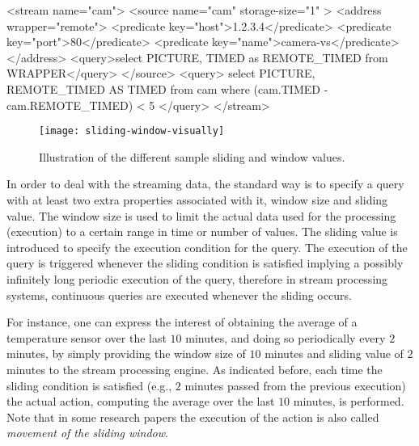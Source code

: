 \begin{xmlcode}[caption={A stream using both local and remote timestamps.}, label=vs:complex-time]
<stream name="cam">
   <source name="cam"  storage-size="1" >
      <address wrapper="remote">
         <predicate key="host">1.2.3.4</predicate>
         <predicate key="port">80</predicate>
         <predicate key="name">camera-vs</predicate>
      </address>
      <query>select PICTURE, TIMED as REMOTE_TIMED from WRAPPER</query>
   </source>
   <query>
      select PICTURE, REMOTE_TIMED AS TIMED from cam where 
      (cam.TIMED - cam.REMOTE_TIMED) < 5
   </query>
</stream>
\end{xmlcode}

\begin{figure}
  \centering
  \texttt{[image: sliding-window-visually]}
  \caption{Illustration of the different sample sliding and window values.}
  \label{fig:sliding-window-visually}
\end{figure}

In order to deal with the streaming data, the standard way is to specify
a query with at least two extra properties associated with it,
window size and sliding value. The window size is used to limit
the actual data used for the processing (execution)  to a certain range
in time or number of values. The sliding value is introduced to
specify the execution condition for the query. The execution of the
query is triggered whenever the sliding condition is satisfied implying a possibly infinitely long periodic
execution of the query, therefore in stream processing systems, continuous queries are executed whenever the sliding occurs.

For instance, one can express the interest
of obtaining the average of a temperature sensor over the last $10$
minutes, and doing so periodically every $2$ minutes, by simply
providing the window size of $10$ minutes and sliding value of $2$
minutes to the stream processing engine. As indicated before, each
time the sliding condition is satisfied (e.g., $2$ minutes passed from
the previous execution) the actual action, computing the average over the last $10$
minutes, is performed. Note that in some research papers the
execution of the action is also called \emph{movement of the sliding
window}. 

